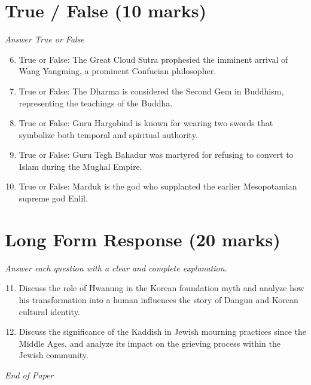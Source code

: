 \documentclass[12pt]{article}
\begin{document}
\section*{True / False (10 marks)}
\textit{Answer True or False}
\begin{enumerate}[label=\arabic*.]
\setcounter{enumi}{5}
\item True or False: The Great Cloud Sutra prophesied the imminent arrival of Wang Yangming, a prominent Confucian philosopher.
\item True or False: The Dharma is considered the Second Gem in Buddhism, representing the teachings of the Buddha.
\item True or False: Guru Hargobind is known for wearing two swords that symbolize both temporal and spiritual authority.
\item True or False: Guru Tegh Bahadur was martyred for refusing to convert to Islam during the Mughal Empire.
\item True or False: Marduk is the god who supplanted the earlier Mesopotamian supreme god Enlil.
\end{enumerate}

\section*{Long Form Response (20 marks)}
\textit{Answer each question with a clear and complete explanation.}
\begin{enumerate}[label=\arabic*.]
\setcounter{enumi}{10}
\item Discuss the role of Hwanung in the Korean foundation myth and analyze how his transformation into a human influences the story of Dangun and Korean cultural identity.
\item Discuss the significance of the Kaddish in Jewish mourning practices since the Middle Ages, and analyze its impact on the grieving process within the Jewish community.
\end{enumerate}

\vfill
\noindent\textit{End of Paper}
\end{document}
